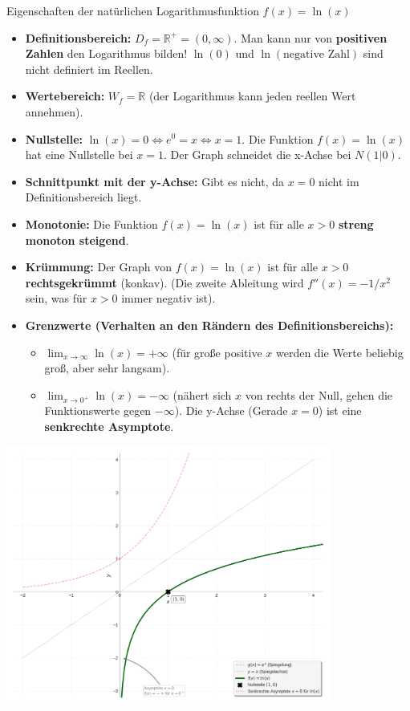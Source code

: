 \begin{merksatzumgebung}{Eigenschaften der natürlichen Logarithmusfunktion \texorpdfstring{$f(x)=\ln(x)$}{f(x)=ln(x)}}
\begin{itemize}
    \item \textbf{Definitionsbereich:} $D_f = \mathbb{R}^+ = (0, \infty)$. Man kann nur von \textbf{positiven Zahlen} den Logarithmus bilden! $\ln(0)$ und $\ln(\text{negative Zahl})$ sind nicht definiert im Reellen.
    \item \textbf{Wertebereich:} $W_f = \mathbb{R}$ (der Logarithmus kann jeden reellen Wert annehmen).
    \item \textbf{Nullstelle:} $\ln(x) = 0 \Leftrightarrow e^0 = x \Leftrightarrow x=1$. Die Funktion $f(x)=\ln(x)$ hat eine Nullstelle bei $x=1$. Der Graph schneidet die x-Achse bei $N(1|0)$.
    \item \textbf{Schnittpunkt mit der y-Achse:} Gibt es nicht, da $x=0$ nicht im Definitionsbereich liegt.
    \item \textbf{Monotonie:} Die Funktion $f(x)=\ln(x)$ ist für alle $x > 0$ \textbf{streng monoton steigend}.
    \item \textbf{Krümmung:} Der Graph von $f(x)=\ln(x)$ ist für alle $x > 0$ \textbf{rechtsgekrümmt} (konkav). (Die zweite Ableitung wird $f''(x) = -1/x^2$ sein, was für $x>0$ immer negativ ist).
    \item \textbf{Grenzwerte (Verhalten an den Rändern des Definitionsbereichs):}
        \begin{itemize}
            \item $\lim_{x \to \infty} \ln(x) = +\infty$ (für große positive $x$ werden die Werte beliebig groß, aber sehr langsam).
            \item $\lim_{x \to 0^+} \ln(x) = -\infty$ (nähert sich $x$ von rechts der Null, gehen die Funktionswerte gegen $-\infty$). Die y-Achse (Gerade $x=0$) ist eine \textbf{senkrechte Asymptote}.
        \end{itemize}
\end{itemize}
\end{merksatzumgebung}
\begin{center}
    \includegraphics[width=0.8\textwidth]{grafiken/Logarithmusfunktion_lnx.png}
    \label{fig:log_funktion_lnx}
\end{center}
